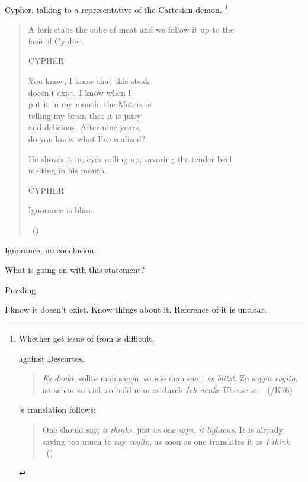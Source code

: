 \begin{note}
  Cypher, talking to a representative of the \hyperlink{cite.Descartes:1996vp}{Cartesian} demon.%
  \footnote{
    Whether get issue of  from \citeauthor{Descartes:1996vp} is difficult.

    \citeauthor{Lichtenberg:1991tf} against Descartes.

    \begin{quote}
      \emph{Es denkt}, sollte man sagen, so wie man sagt: \emph{es blitzt}.
      Zu sagen \emph{cogito}, ist schon zu viel, so bald man es durch \emph{Ich denke} \"{U}bersetzt.
      \mbox{ }\hfill\mbox{(\citeyear[412]{Lichtenberg:1991tf}/K76)}
    \end{quote}

    \citeauthor{Zoller:1992ud}'s translation follows:
    \begin{quote}
      One should say, \emph{it thinks}, just as one says, \emph{it lightens}.
      It is already saying too much to say \emph{cogito}, as soon as one translates it as \emph{I think}.
      \mbox{ }\hfill\mbox{(\citeyear[418]{Zoller:1992ud})}
    \end{quote}
  }
  \begin{quote}
    {
    \ttfamily

    A fork stabs the cube of meat and we follow it up to the  \\
    face of Cypher.

    \qquad\qquad CYPHER

    \qquad You know, I know that this steak \\
    \indent\qquad doesn't exist. I know when I \\
    \indent\qquad put it in my mouth, the Matrix is \\
    \indent\qquad telling my brain that it is juicy \\
    \indent\qquad and delicious. After nine years, \\
    \indent\qquad do you know what I've realized?

    He shoves it in, eyes rolling up, savoring the tender beef \\
    melting in his mouth.

    \qquad\qquad CYPHER

    \qquad Ignorance is bliss.}%
    \mbox{ }\hfill\mbox{(\citeyear[330--331]{Wachowski:2000uh})}
  \end{quote}

  Ignorance, no conclusion.

  What is going on with this statement?

  Puzzling.

  I know it doesn't exist.
  Know things about it.
  Reference of it is unclear.
\end{note}


